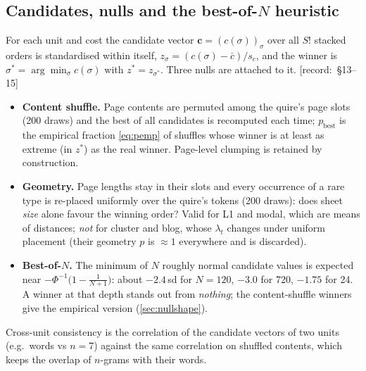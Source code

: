 \documentclass[11pt,a4paper]{article}
\newcommand{\src}[1]{{\footnotesize\color{muted}\sffamily\mbox{[record: \S#1]}}}
\begin{document}
\subsection{Candidates, nulls and the best-of-$N$ heuristic}
\label{sec:nulls}

For each unit and cost the candidate vector $\mathbf{c}=(c(\sigma))_{\sigma}$ over all $S!$ stacked orders is standardised within itself, $z_\sigma=(c(\sigma)-\bar c)/s_c$, and the winner is $\sigma^\ast=\arg\min_\sigma c(\sigma)$ with $z^\ast=z_{\sigma^\ast}$. Three nulls are attached to it. \src{13--15}
\begin{itemize}
\item \textbf{Content shuffle.} Page contents are permuted among the quire's page slots (200 draws) and the best of all candidates is recomputed each time; $p_{\text{best}}$ is the empirical fraction \cref{eq:pemp} of shuffles whose winner is at least as extreme (in $z^\ast$) as the real winner. Page-level clumping is retained by construction.
\item \textbf{Geometry.} Page lengths stay in their slots and every occurrence of a rare type is re-placed uniformly over the quire's tokens (200 draws): does sheet \emph{size} alone favour the winning order? Valid for L1 and modal, which are means of distances; \emph{not} for cluster and blog, whose $\lambda_t$ changes under uniform placement (their geometry $p$ is $\approx1$ everywhere and is discarded).
\item \textbf{Best-of-$N$.} The minimum of $N$ roughly normal candidate values is expected near $-\Phi^{-1}\!\bigl(1-\tfrac{1}{N+1}\bigr)$: about $-2.4$\,sd for $N=120$, $-3.0$ for 720, $-1.75$ for 24. A winner at that depth stands out from \emph{nothing}; the content-shuffle winners give the empirical version (\cref{sec:nullshape}).
\end{itemize}
Cross-unit consistency is the correlation of the candidate vectors of two units (e.g.\ words vs $n=7$) against the same correlation on shuffled contents, which keeps the overlap of $n$-grams with their words.
\end{document}

